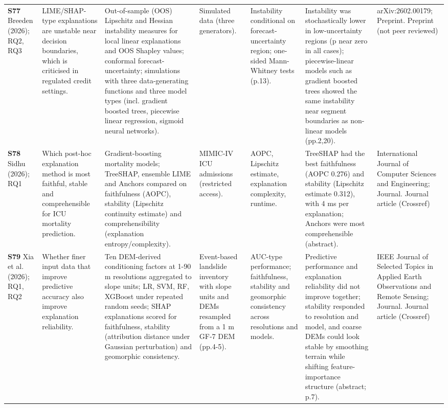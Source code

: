 \begin{longtable}{@{}P{1.55cm}P{2.9cm}P{4.5cm}P{3.2cm}P{3.4cm}P{4.6cm}P{3.6cm}@{}}
\textbf{S77} \cite{S77} Breeden (2026); RQ2, RQ3 & LIME/\allowbreak{}SHAP-type explanations are unstable near decision boundaries, which is criticised in regulated credit settings. & Out-of-sample (OOS) Lipschitz and Hessian instability measures for local linear explanations and OOS Shapley values; conformal forecast-uncertainty; simulations with three data-generating functions and three model types (incl. gradient boosted trees, piecewise linear regression, sigmoid neural networks). & Simulated data (three generators). & Instability conditional on forecast-uncertainty region; one-sided Mann-Whitney tests (p.13). & Instability was stochastically lower in low-uncertainty regions (p near zero in all cases); piecewise-linear models such as gradient boosted trees showed the same instability near segment boundaries as non-linear models (pp.2,20). & arXiv:2602.00179; Preprint. Preprint (not peer reviewed) \\
\textbf{S78} \cite{S78} Sidhu (2026); RQ1 & Which post-hoc explanation method is most faithful, stable and comprehensible for ICU mortality prediction. & Gradient-boosting mortality models; TreeSHAP, ensemble LIME and Anchors compared on faithfulness (AOPC), stability (Lipschitz continuity estimate) and comprehensibility (explanation entropy/\allowbreak{}complexity). & MIMIC-IV ICU admissions (restricted access). & AOPC, Lipschitz estimate, explanation complexity, runtime. & TreeSHAP had the best faithfulness (AOPC 0.276) and stability (Lipschitz estimate 0.312), with 4 ms per explanation; Anchors were most comprehensible (abstract). & International Journal of Computer Sciences and Engineering; Journal. Journal article (Crossref) \\
\textbf{S79} \cite{S79} Xia et al. (2026); RQ1, RQ2 & Whether finer input data that improve predictive accuracy also improve explanation reliability. & Ten DEM-derived conditioning factors at 1-90 m resolutions aggregated to slope units; LR, SVM, RF, XGBoost under repeated random seeds; SHAP explanations scored for faithfulness, stability (attribution distance under Gaussian perturbation) and geomorphic consistency. & Event-based landslide inventory with slope units and DEMs resampled from a 1 m GF-7 DEM (pp.4-5). & AUC-type performance; faithfulness, stability and geomorphic consistency across resolutions and models. & Predictive performance and explanation reliability did not improve together; stability responded to resolution and model, and coarse DEMs could look stable by smoothing terrain while shifting feature-importance structure (abstract; p.7). & IEEE Journal of Selected Topics in Applied Earth Observations and Remote Sensing; Journal. Journal article (Crossref) \\

\end{longtable}
